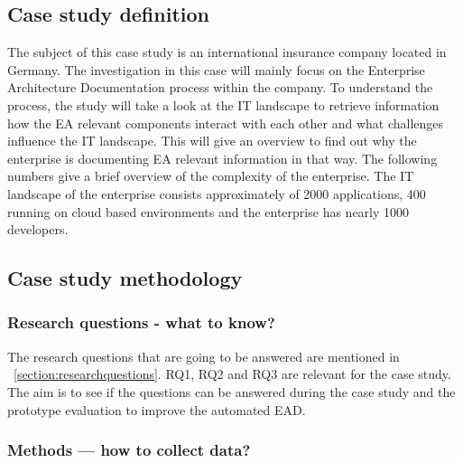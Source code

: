 \subsection{Case study definition}\label{subsection:casestudyobjectives}

The subject of this case study is an international insurance company located in Germany. The investigation in this case will mainly focus on the Enterprise Architecture Documentation process within the company. To understand the process, the study will take a look at the IT landscape to retrieve information how the EA relevant components interact with each other and what challenges influence the IT landscape. This will give an overview to find out why the enterprise is documenting EA relevant information in that way.
The following numbers give a brief overview of the complexity of the enterprise. The IT landscape of the enterprise consists approximately of 2000 applications, 400 running on cloud based environments and the enterprise has nearly 1000 developers.

\subsection{Case study methodology}\label{subsection:casestudymethodology}

\subsubsection{Research questions -  what to know?}
The research questions that are going to be answered are mentioned in ~\ref{section:researchquestions}.
RQ1, RQ2 and RQ3 are relevant for the case study. The aim is to see if the questions can be answered during the case study and the prototype evaluation to improve the automated EAD.

\subsubsection{Methods — how to collect data?}

